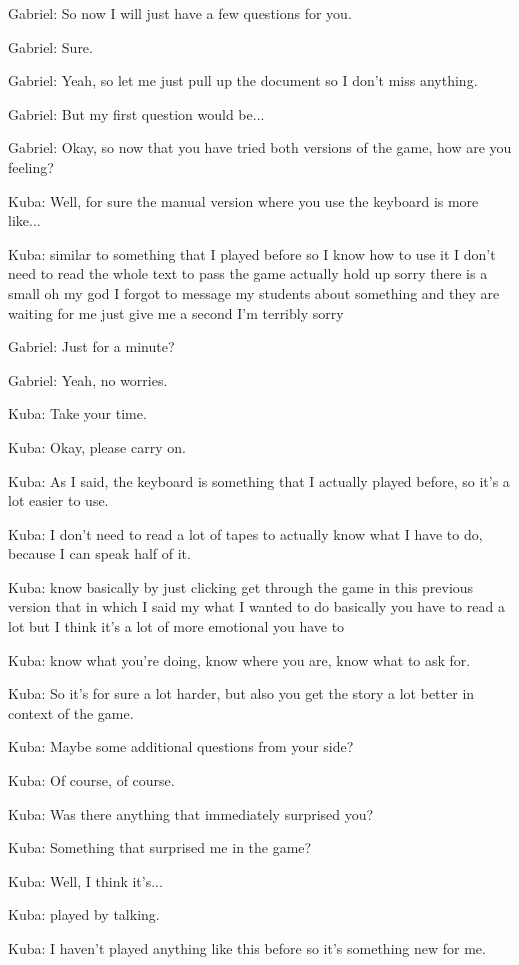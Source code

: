 Gabriel: So now I will just have a few questions for you.

Gabriel: Sure.

Gabriel: Yeah, so let me just pull up the document so I don't miss anything.

Gabriel: But my first question would be...

Gabriel: Okay, so now that you have tried both versions of the game, how are you feeling?

Kuba: Well, for sure the manual version where you use the keyboard is more like...

Kuba: similar to something that I played before so I know how to use it I don't need to read the whole text to pass the game actually hold up sorry there is a small oh my god I forgot to message my students about something and they are waiting for me just give me a second I'm terribly sorry

Gabriel: Just for a minute?

Gabriel: Yeah, no worries.

Kuba: Take your time.

Kuba: Okay, please carry on.

Kuba: As I said, the keyboard is something that I actually played before, so it's a lot easier to use.

Kuba: I don't need to read a lot of tapes to actually know what I have to do, because I can speak half of it.

Kuba: know basically by just clicking get through the game in this previous version that in which I said my what I wanted to do basically you have to read a lot but I think it's a lot of more emotional you have to

Kuba: know what you're doing, know where you are, know what to ask for.

Kuba: So it's for sure a lot harder, but also you get the story a lot better in context of the game.

Kuba: Maybe some additional questions from your side?

Kuba: Of course, of course.

Kuba: Was there anything that immediately surprised you?

Kuba: Something that surprised me in the game?

Kuba: Well, I think it's...

Kuba: played by talking.

Kuba: I haven't played anything like this before so it's something new for me.

